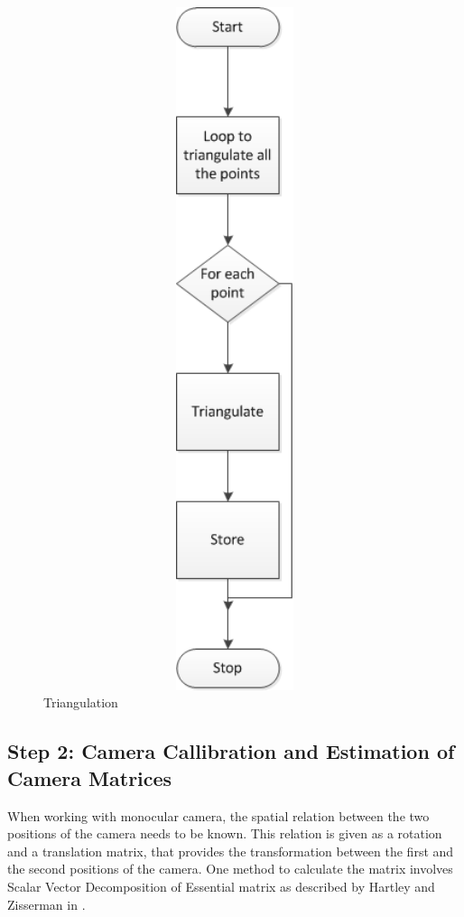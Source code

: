 \begin{figure} [ht]
\begin{minipage}[b]{0.45\linewidth}
    \includegraphics[width=20cm,height=20cm,keepaspectratio]{Pictures/Triangulate}
    \caption{Triangulation}
    \label{fig:Triangulate}
	\end{minipage}
\end{figure}

\subsection{Step 2:  Camera Callibration and Estimation of Camera Matrices}

When working with monocular camera, the spatial relation between the two positions of the camera needs to be known. This relation is given as a rotation and a translation matrix, that provides the transformation between the first and the second positions of the camera. One method to calculate the matrix involves Scalar Vector Decomposition of Essential matrix as described by Hartley and Zisserman in \cite{hartley2003multiple}. 


